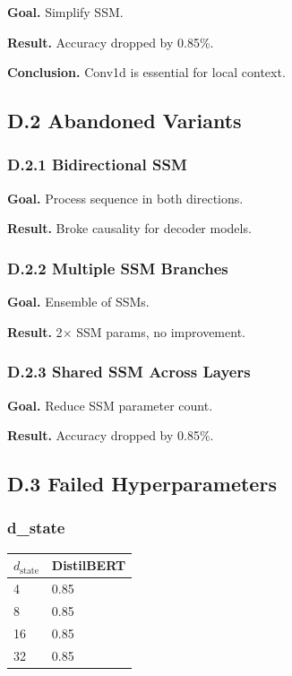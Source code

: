 \textbf{Goal.} Simplify SSM.

\textbf{Result.} Accuracy dropped by 0.85\%.

\textbf{Conclusion.} Conv1d is essential for local context.

\subsection{D.2 Abandoned Variants}

\subsubsection{D.2.1 Bidirectional SSM}

\textbf{Goal.} Process sequence in both directions.

\textbf{Result.} Broke causality for decoder models.

\subsubsection{D.2.2 Multiple SSM Branches}

\textbf{Goal.} Ensemble of SSMs.

\textbf{Result.} 2$\times$ SSM params, no improvement.

\subsubsection{D.2.3 Shared SSM Across Layers}

\textbf{Goal.} Reduce SSM parameter count.

\textbf{Result.} Accuracy dropped by 0.85\%.

\subsection{D.3 Failed Hyperparameters}

\subsubsection{d\_state}

\begin{table}[H]
\centering
\small
\begin{tabular}{ll}
\toprule
\textbf{$d_\text{state}$} & \textbf{DistilBERT} \\
\midrule
4 & 0.85 \\
8 & 0.85 \\
16 & 0.85 \\
32 & 0.85 \\
\bottomrule
\end{tabular}
\end{table}

